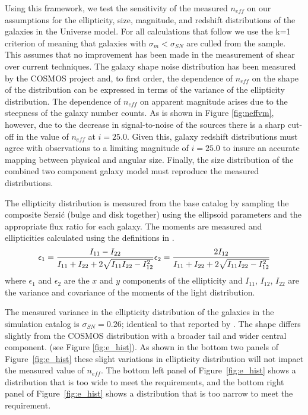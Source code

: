 \documentclass[]{article}
\begin{document}
Using this framework, we test the sensitivity of the measured
$n_{eff}$ on our assumptions for the ellipticity, size, magnitude, and
redshift distributions of the galaxies in the Universe model.  For all
calculations that follow we use the k=1 criterion of \citet{chang}
meaning that galaxies with $\sigma_m < \sigma_{SN}$ are culled from
the sample. This assumes that no improvement has been made in the
measurement of shear over current techniques.  The galaxy shape noise
distribution has been measured by the COSMOS project \citep{cosmos}
and, to first order, the dependence of $n_{eff}$ on the shape of the
distribution can be expressed in terms of the variance of the
ellipticity distribution. The dependence of $n_{eff}$ on apparent
magnitude arises due to the steepness of the galaxy number counts. As
is shown in Figure \ref{fig:neffvm}, however, due to the decrease in
signal-to-noise of the sources there is a sharp cut-off in the value
of $n_{eff}$ at $i=25.0$.  Given this, galaxy redshift distributions
must agree with observations to a limiting magnitude of $i=25.0$ to
insure an accurate mapping between physical and angular size.
Finally, the size distribution of the combined two component galaxy
model must reproduce the measured distributions.

The ellipticity distribution is measured from the base catalog by
sampling the composite Sersi{\'c} (bulge and disk together) using the
ellipsoid parameters and the appropriate flux ratio for each galaxy.
The moments are measured and ellipticities calculated using the
definitions in \citet{chang}.
\begin{equation}
\epsilon_1 = \frac{I_{11}-I_{22}}{I_{11}+I_{22}+2\sqrt{I_{11}I_{22} - I^{2}_{12}}}\\
\epsilon_2 = \frac{2I_{12}}{I_{11}+I_{22}+2\sqrt{I_{11}I_{22} - I^{2}_{12}}}
\end{equation}
where $\epsilon_1$ and $\epsilon_2$ are the $x$ and $y$ components of
the ellipticity and $I_{11}$, $I_{12}$, $I_{22}$ are the variance and
covariance of the moments of the light distribution.

The measured variance in the ellipticity distribution of the galaxies
in the simulation catalog is $\sigma_{SN} = 0.26$; identical to that
reported by \citet{chang}. The shape differs slightly from the COSMOS
distribution with a broader tail and wider central component. (see
Figure \ref{fig:e_hist}).  As shown in
the bottom two panels of Figure~\ref{fig:e_hist} these
slight variations in ellipticity distribution will not impact the
measured value of $n_{eff}$.  The bottom left panel of Figure~\ref{fig:e_hist}
shows a distribution that is too wide to meet the requirements, and the bottom
right panel of Figure~\ref{fig:e_hist} shows a distribution that is 
too narrow to meet the requirement.
\end{document}
